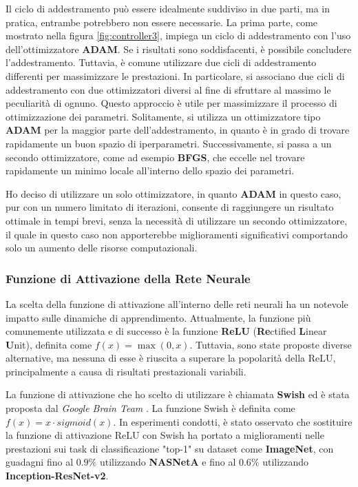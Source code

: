 Il ciclo di addestramento può essere idealmente suddiviso in due parti, 
ma in pratica, entrambe potrebbero non essere necessarie. 
La prima parte, come mostrato nella figura \ref{fig:controller3}, 
impiega un ciclo di addestramento con l'uso dell'ottimizzatore 
\textbf{ADAM}. Se i risultati sono soddisfacenti, è possibile 
concludere l'addestramento. Tuttavia, è comune utilizzare due cicli 
di addestramento differenti per massimizzare le prestazioni. 
In particolare, si associano due cicli di addestramento con due 
ottimizzatori diversi al fine di sfruttare al massimo le peculiarità 
di ognuno. Questo approccio è utile per massimizzare il processo di 
ottimizzazione dei parametri. Solitamente, si utilizza un 
ottimizzatore tipo \textbf{ADAM} per la maggior parte dell'addestramento, 
in quanto è in grado di trovare rapidamente un buon spazio di iperparametri. 
Successivamente, si passa a un secondo ottimizzatore, come ad esempio 
\textbf{BFGS}, che eccelle nel trovare rapidamente un minimo locale 
all'interno dello spazio dei parametri.

Ho deciso di utilizzare un solo ottimizzatore, in quanto \textbf{ADAM} 
in questo caso, pur con un numero limitato di iterazioni, consente di 
raggiungere un risultato ottimale in tempi brevi, senza la necessità di 
utilizzare un secondo ottimizzatore, il quale in questo caso non 
apporterebbe miglioramenti significativi comportando solo un aumento 
delle risorse computazionali.

\subsubsection*{Funzione di Attivazione della Rete Neurale}
La scelta della funzione di attivazione all'interno delle reti neurali 
ha un notevole impatto sulle dinamiche di apprendimento. Attualmente, 
la funzione più comunemente utilizzata e di successo è la funzione 
\textbf{ReLU} (\textbf{Re}ctified \textbf{L}inear \textbf{U}nit), 
definita come $f(x) = \max(0, x)$. Tuttavia, sono state proposte 
diverse alternative, ma nessuna di esse è riuscita a superare la 
popolarità della ReLU, principalmente a causa di risultati 
prestazionali variabili.

La funzione di attivazione che ho scelto di utilizzare è chiamata 
\textbf{Swish} ed è stata proposta dal \emph{Google Brain Team} 
\cite{ramachandran2017searching}. La funzione Swish è definita 
come $f(x) = x \cdot sigmoid(x)$. In esperimenti condotti, è 
stato osservato che sostituire la funzione di attivazione ReLU 
con Swish ha portato a miglioramenti nelle prestazioni sui task 
di classificazione "top-1" su dataset come \textbf{ImageNet}, con 
guadagni fino al $0.9\%$ utilizzando \textbf{NASNetA} e fino al 
$0.6\%$ utilizzando \textbf{Inception-ResNet-v2}.

